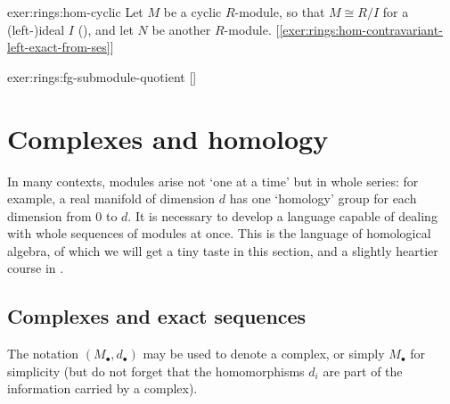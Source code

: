 \begin{exer}{\lnot}{exer:rings:hom-cyclic}
  Let $M$ be a cyclic $R$-module, so that $M \cong R/I$ for a
  (left-)ideal $I$ (), and let $N$ be
  another $R$-module.
  [\ref{exer:rings:hom-contravariant-left-exact-from-ses}]
\end{exer}
\begin{exer}{\exerused}{exer:rings:fg-submodule-quotient}
   []
\end{exer}

\section{Complexes and homology}
\label{sec:rings:complexes-and-homology}

In many contexts, modules arise not `one at a time' but in whole
series: for example, a real manifold of dimension $d$ has one
`homology' group for each dimension from $0$ to $d$. It is necessary
to develop a language capable of dealing with whole sequences of
modules at once. This is the language of homological algebra, of which
we will get a tiny taste in this section, and a slightly heartier
course in .

\subsection{Complexes and exact sequences}
\label{subsec:rings:complexes-and-exact-sequences}
The notation
$(M_\bullet, d_\bullet)$ may be used to denote a complex, or simply
$M_\bullet$ for simplicity (but do not forget that the homomorphisms
$d_i$ are part of the information carried by a complex).

